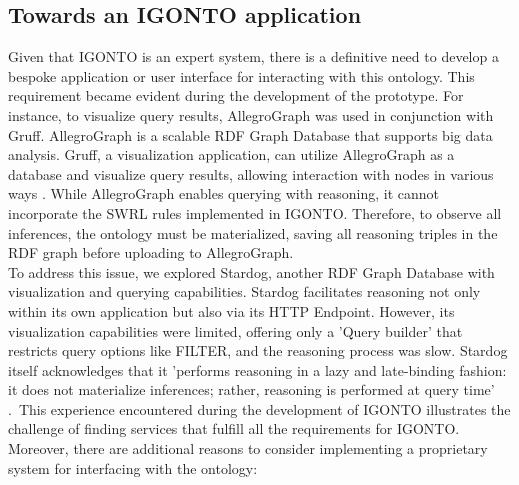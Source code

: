 \documentclass[
  a4paper,  %
  twoside,  %
  bibliography=totoc,
  headsepline,
  cleardoublepage=empty,
  parskip=half,
  draft=false
]{scrbook}
\begin{document}
\subsection{Towards an IGONTO application}
Given that IGONTO is an expert system, there is a definitive need to develop a bespoke application or user interface for interacting with this ontology. This requirement became evident during the development of the prototype. For instance, to visualize query results, AllegroGraph was used in conjunction with Gruff. AllegroGraph is a scalable RDF Graph Database that supports big data analysis. Gruff, a visualization application, can utilize AllegroGraph as a database and visualize query results, allowing interaction with nodes in various ways \cite{FranzAllegroGraph}. While AllegroGraph enables querying with reasoning, it cannot incorporate the SWRL rules implemented in IGONTO. Therefore, to observe all inferences, the ontology must be materialized, saving all reasoning triples in the RDF graph before uploading to AllegroGraph. \\
To address this issue, we explored Stardog, another RDF Graph Database with visualization and querying capabilities. Stardog facilitates reasoning not only within its own application but also via its HTTP Endpoint. However, its visualization capabilities were limited, offering only a 'Query builder' that restricts query options like FILTER, and the reasoning process was slow. Stardog itself acknowledges that it 'performs reasoning in a lazy and late-binding fashion: it does not materialize inferences; rather, reasoning is performed at query time' \cite{Stardog}.\
This experience encountered during the development of IGONTO illustrates the challenge of finding services that fulfill all the requirements for IGONTO. Moreover, there are additional reasons to consider implementing a proprietary system for interfacing with the ontology:
\end{document}

